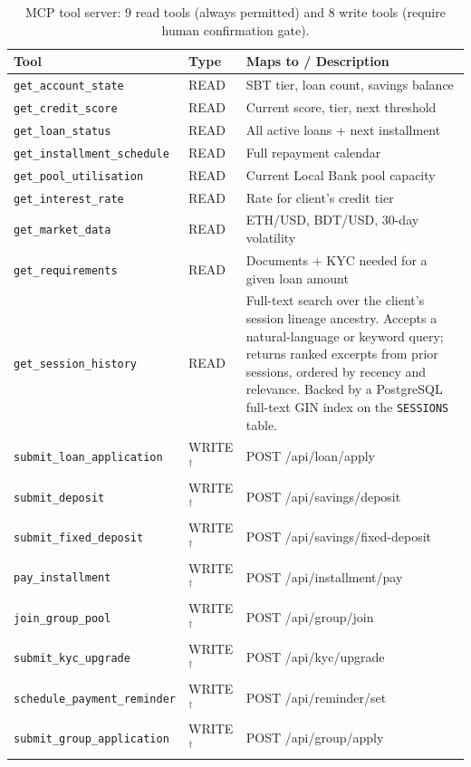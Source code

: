 \documentclass[12pt,a4paper]{report}
\begin{document}
\begin{table}[H]
\centering
\caption{MCP tool server: 9 read tools (always permitted) and 8 write tools (require human confirmation gate).}
\label{tab:mcp-tools}
\small
\begin{tabular}{p{4.8cm}p{1.4cm}p{6.3cm}}
\hline
\textbf{Tool} & \textbf{Type} & \textbf{Maps to / Description} \\
\hline
\texttt{get\_account\_state}         & READ & SBT tier, loan count, savings balance \\
\texttt{get\_credit\_score}          & READ & Current score, tier, next threshold \\
\texttt{get\_loan\_status}           & READ & All active loans + next installment \\
\texttt{get\_installment\_schedule}  & READ & Full repayment calendar \\
\texttt{get\_pool\_utilisation}      & READ & Current Local Bank pool capacity \\
\texttt{get\_interest\_rate}         & READ & Rate for client's credit tier \\
\texttt{get\_market\_data}           & READ & ETH/USD, BDT/USD, 30-day volatility \\
\texttt{get\_requirements}           & READ & Documents + KYC needed for a given loan amount \\
\texttt{get\_session\_history}       & READ & Full-text search over the client's session lineage ancestry. Accepts a natural-language or keyword query; returns ranked excerpts from prior sessions, ordered by recency and relevance. Backed by a PostgreSQL full-text GIN index on the \texttt{SESSIONS} table. \\
\hline
\texttt{submit\_loan\_application}   & WRITE$^{\dagger}$ & POST /api/loan/apply \\
\texttt{submit\_deposit}             & WRITE$^{\dagger}$ & POST /api/savings/deposit \\
\texttt{submit\_fixed\_deposit}      & WRITE$^{\dagger}$ & POST /api/savings/fixed-deposit \\
\texttt{pay\_installment}            & WRITE$^{\dagger}$ & POST /api/installment/pay \\
\texttt{join\_group\_pool}           & WRITE$^{\dagger}$ & POST /api/group/join \\
\texttt{submit\_kyc\_upgrade}        & WRITE$^{\dagger}$ & POST /api/kyc/upgrade \\
\texttt{schedule\_payment\_reminder} & WRITE$^{\dagger}$ & POST /api/reminder/set \\
\texttt{submit\_group\_application}  & WRITE$^{\dagger}$ & POST /api/group/apply \\
\hline
\end{tabular}


\end{table}
\end{document}
